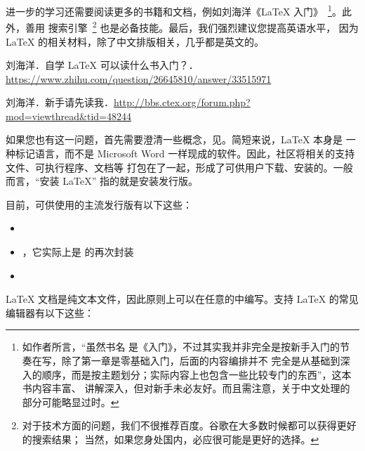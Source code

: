 进一步的学习还需要阅读更多的书籍和文档，例如刘海洋《\LaTeX{} 入门》~\footnote{如作者所言，“虽然书名
是《入门》，不过其实我并非完全是按新手入门的节奏在写，除了第一章是零基础入门，后面的内容编排并不
完全是从基础到深入的顺序，而是按主题划分；实际内容上也包含一些比较专门的东西”，这本书内容丰富、
讲解深入，但对新手未必友好。而且需注意，关于中文处理的部分可能略显过时。}。此外，善用
搜索引擎~\footnote{对于技术方面的问题，我们不很推荐百度。谷歌在大多数时候都可以获得更好的搜索结果；
当然，如果您身处国内，必应很可能是更好的选择。} 也是必备技能。最后，我们强烈建议您提高英语水平，
因为 \LaTeX{} 的相关材料，除了中文排版相关，几乎都是英文的。

\begin{reference}
  \item 刘海洋．自学 \LaTeX{} 可以读什么书入门？．
    \url{https://www.zhihu.com/question/26645810/answer/33515971}
  \item 刘海洋．新手请先读我．\url{http://bbs.ctex.org/forum.php?mod=viewthread&tid=48244}
\end{reference}



如果您也有这一问题，首先需要澄清一些概念，见。简短来说，\LaTeX{} 本身是
一种标记语言，而不是 Microsoft Word 一样现成的软件。因此，社区将相关的支持文件、可执行程序、文档等
打包在了一起，形成了可供用户下载、安装的。一般而言，“安装 \LaTeX{}”
指的就是安装发行版。

目前，可供使用的主流发行版有以下这些：

\begin{itemize}
  \item \TeXLive{}
  \item \MacTeX{}，它实际上是 \TeXLive{} 的再次封装
  \item \MiKTeX{}
\end{itemize}



\LaTeX{} 文档是纯文本文件，因此原则上可以在任意的中编写。支持 \LaTeX{} 的常见
编辑器有以下这些：

